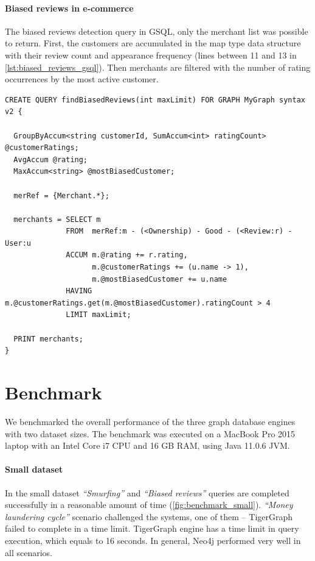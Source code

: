\paragraph{Biased reviews in e-commerce}

The biased reviews detection query in GSQL, only the merchant list was possible to return.
First, the customers are accumulated in the map type data structure with their review count and appearance frequency (lines between 11 and 13 in \autoref{lst:biased_reviews_gsql}).
Then merchants are filtered with the number of rating occurrences by the most active customer.

\begin{lstlisting}[language=Cypher,frame=single,basicstyle=\footnotesize\ttfamily,caption={GSQL biased reviews detection query},label={lst:biased_reviews_gsql}]
CREATE QUERY findBiasedReviews(int maxLimit) FOR GRAPH MyGraph syntax v2 {

  GroupByAccum<string customerId, SumAccum<int> ratingCount> @customerRatings;
  AvgAccum @rating;
  MaxAccum<string> @mostBiasedCustomer;

  merRef = {Merchant.*};

  merchants = SELECT m
              FROM  merRef:m - (<Ownership) - Good - (<Review:r) - User:u
              ACCUM m.@rating += r.rating,
                    m.@customerRatings += (u.name -> 1),
                    m.@mostBiasedCustomer += u.name
              HAVING m.@customerRatings.get(m.@mostBiasedCustomer).ratingCount > 4
              LIMIT maxLimit;

  PRINT merchants;
}
\end{lstlisting}

\section{Benchmark} \label{sec:static_benchmark}

We benchmarked the overall performance of the three graph database engines with two dataset sizes.
The benchmark was executed on a MacBook Pro 2015 laptop with an Intel Core i7 CPU and 16 GB RAM, using Java 11.0.6 JVM.

\paragraph{Small dataset}
In the small dataset \textit{``Smurfing''} and \textit{``Biased reviews''} queries are completed successfully in a reasonable amount of time (\autoref{fig:benchmark_small}).
\textit{``Money laundering cycle''} scenario challenged the systems, one of them -- TigerGraph failed to complete in a time limit.
TigerGraph engine has a time limit in query execution, which equals to 16 seconds.
In general, Neo4j performed very well in all scenarios.

